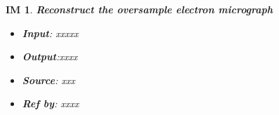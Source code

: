 \documentclass[12pt]{article}
\newtheorem{IM}{IM}
\begin{document}
\begin{IM}
\label{IM_5}
\noindent\colorbox{shadecolorIM}{\normalfont \textbf{Reconstruct the oversample electron micrograph}}
\normalfont
\begin{itemize}
\item \textbf{Input}: xxxxx
\item \textbf{Output}:xxxx

\item \textbf{Source}: xxx
\item \textbf{Ref by}: xxxx
\end{itemize}
\end{IM}
\end{document}
